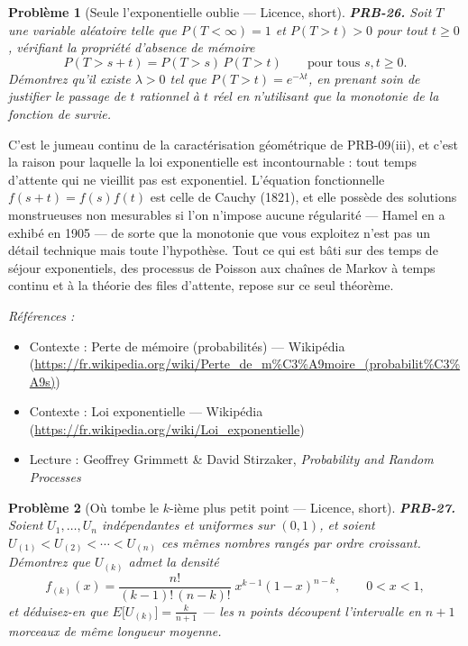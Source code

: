 \documentclass[11pt]{article}
\newtheorem{problem}{Problème}
\newenvironment{refs}{\par\small\noindent\emph{Références :}\begin{itemize}\setlength\itemsep{0pt}}{\end{itemize}\normalsize}
\begin{document}
\bigskip

\begin{problem}[{Seule l'exponentielle oublie --- Licence, short}]
\textbf{PRB-26.} Soit $ T $ une variable aléatoire telle que
$ P(T < \infty) = 1 $ et $ P(T > t) > 0 $ pour tout $ t \ge 0 $, vérifiant la
propriété d'absence de mémoire
\[ P(T > s+t) = P(T > s)\, P(T > t) \qquad \text{pour tous } s,t \ge 0 . \]
Démontrez qu'il existe $ \lambda > 0 $ tel que $ P(T > t) = e^{-\lambda t} $, en prenant
soin de justifier le passage de $ t $ rationnel à $ t $ réel en n'utilisant que la monotonie de
la fonction de survie.
\end{problem}

\noindent C'est le jumeau continu de la caractérisation géométrique de PRB-09(iii), et
c'est la raison pour laquelle la loi exponentielle est incontournable : tout temps d'attente qui ne
vieillit pas est exponentiel. L'équation fonctionnelle $ f(s+t) = f(s)f(t) $ est celle de Cauchy
(1821), et elle possède des solutions monstrueuses non mesurables si l'on n'impose aucune
régularité --- Hamel en a exhibé en 1905 --- de sorte que la monotonie que vous exploitez n'est pas un
détail technique mais toute l'hypothèse. Tout ce qui est bâti sur des temps de séjour exponentiels,
des processus de Poisson aux chaînes de Markov à temps continu et à la théorie des files
d'attente, repose sur ce seul théorème.

\begin{refs}
\item Contexte : Perte de mémoire (probabilités) --- Wikipédia (\url{https://fr.wikipedia.org/wiki/Perte_de_m%C3%A9moire_(probabilit%C3%A9s)})
\item Contexte : Loi exponentielle --- Wikipédia (\url{https://fr.wikipedia.org/wiki/Loi_exponentielle})
\item Lecture : Geoffrey Grimmett \& David Stirzaker, \textit{Probability and Random Processes}
\end{refs}

\bigskip

\begin{problem}[{Où tombe le $ k $-ième plus petit point --- Licence, short}]
\textbf{PRB-27.} Soient $ U_1, \dots, U_n $ indépendantes et uniformes sur
$ (0,1) $, et soient $ U_{(1)} < U_{(2)} < \cdots < U_{(n)} $ ces mêmes nombres rangés
par ordre croissant. Démontrez que $ U_{(k)} $ admet la densité
\[ f_{(k)}(x) = \frac{n!}{(k-1)!\,(n-k)!}\; x^{k-1}(1-x)^{n-k}, \qquad 0 < x < 1, \]
et déduisez-en que $ E\big[U_{(k)}\big] = \frac{k}{n+1} $ --- les $ n $ points découpent
l'intervalle en $ n+1 $ morceaux de même longueur moyenne.
\end{problem}
\end{document}

